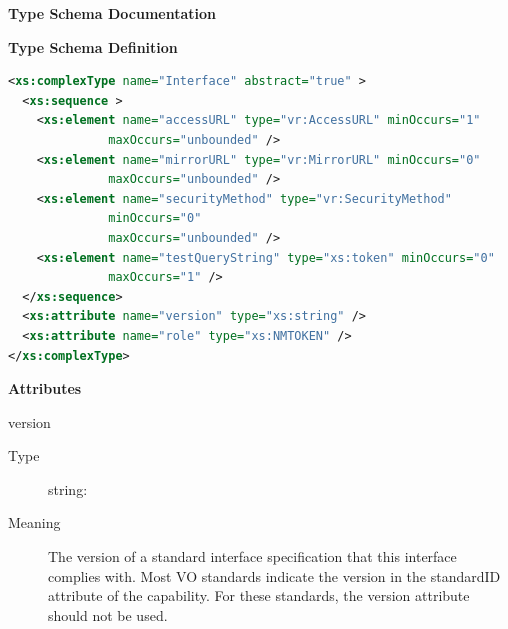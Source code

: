 \documentclass[11pt,a4paper]{ivoa}
\begin{document}
\begin{generated}
\begingroup
      	\renewcommand*\descriptionlabel[1]{%
      	\hbox to 5.5em{\emph{#1}\hfil}}\vspace{2ex}\noindent\textbf{ Type Schema Documentation}




\vspace{1ex}\noindent\textbf{ Type Schema Definition}

\begin{lstlisting}[language=XML,basicstyle=\footnotesize]
<xs:complexType name="Interface" abstract="true" >
  <xs:sequence >
    <xs:element name="accessURL" type="vr:AccessURL" minOccurs="1"
              maxOccurs="unbounded" />
    <xs:element name="mirrorURL" type="vr:MirrorURL" minOccurs="0"
              maxOccurs="unbounded" />
    <xs:element name="securityMethod" type="vr:SecurityMethod"
              minOccurs="0"
              maxOccurs="unbounded" />
    <xs:element name="testQueryString" type="xs:token" minOccurs="0"
              maxOccurs="1" />
  </xs:sequence>
  <xs:attribute name="version" type="xs:string" />
  <xs:attribute name="role" type="xs:NMTOKEN" />
</xs:complexType>
\end{lstlisting}

\vspace{0.5ex}\noindent\textbf{ Attributes}

\begingroup\small\begin{bigdescription}
\item[version]
\begin{description}
\item[Type] string: 
\item[Meaning] 
               The version of a standard interface specification that this 
               interface complies with.  Most VO standards indicate the
               version in the standardID attribute of the capability.  For
               these standards, the version attribute should not be used.
            

\end{description}
\end{bigdescription}
\end{generated}
\end{document}
